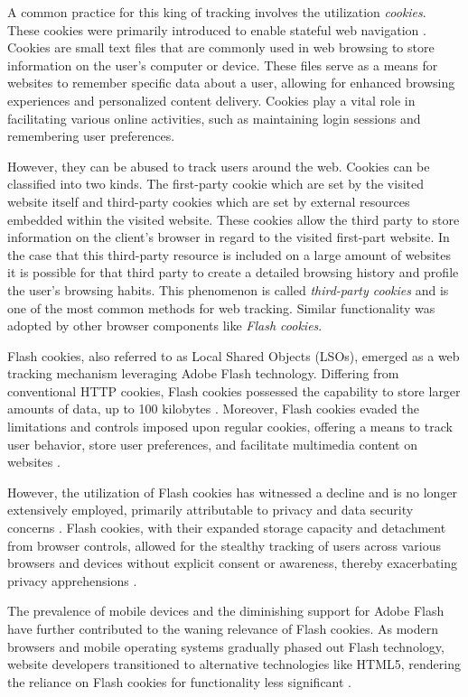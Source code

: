 A common practice for this king of tracking involves the utilization \emph{cookies}. These cookies were primarily introduced to enable 
stateful web navigation \cite{jschwartz}. Cookies are small text files that are commonly used in web browsing to store information
on the user's computer or device. These files serve as a means for websites to remember specific data about a user,
allowing for enhanced browsing experiences and personalized content delivery. Cookies play a vital role in facilitating
various online activities, such as maintaining login sessions and remembering user preferences.

However, they can be abused to track users around the web. Cookies can be classified into two kinds.
The first-party cookie which are set by the visited website itself and third-party cookies which are set by external 
resources embedded within the visited website. These cookies allow the third party to store information on the client's browser in regard 
to the visited first-part website. In the case that this third-party resource is included on a large amount of websites it is possible 
for that third party to create a detailed browsing history and profile the user's browsing habits. This phenomenon is called \emph{third-party cookies}
and is one of the most common methods for web tracking. Similar functionality was adopted by other browser components like
\emph{Flash cookies}. 

Flash cookies, also referred to as Local Shared Objects (LSOs), emerged as a web tracking mechanism leveraging Adobe Flash technology.
Differing from conventional HTTP cookies, Flash cookies possessed the capability to store larger amounts of data, up to 100 kilobytes \cite{sipior2011online}.
Moreover, Flash cookies evaded the limitations and controls imposed upon regular cookies, offering a means to track user behavior,
store user preferences, and facilitate multimedia content on websites \cite{krishnamurthy2011privacy}.

However, the utilization of Flash cookies has witnessed a decline and is no longer extensively employed, primarily attributable
to privacy and data security concerns \cite{hoofnagle2010different}. Flash cookies, with their expanded storage capacity and detachment from browser controls,
allowed for the stealthy tracking of users across various browsers and devices without explicit consent or awareness,
thereby exacerbating privacy apprehensions \cite{soltani2010flash}.

The prevalence of mobile devices and the diminishing support for Adobe Flash have further contributed to the waning relevance of Flash
cookies. As modern browsers and mobile operating systems gradually phased out Flash technology, website developers transitioned to
alternative technologies like HTML5, rendering the reliance on Flash cookies for functionality less significant \cite{bbcflash}.

